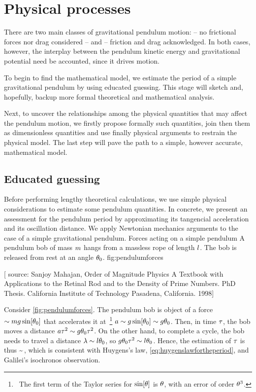 \section{Physical processes}
There are two main classes of gravitational pendulum motion:  -- no frictional forces nor drag considered -- and  -- friction and drag acknowledged. In both cases, however, the interplay between the pendulum kinetic energy and gravitational potential need be accounted, since it drives motion.

To begin to find the mathematical model, we estimate the period of a simple gravitational pendulum by using educated guessing. This stage will sketch and, hopefully, backup more formal theoretical and mathematical analysis.

Next, to uncover the relationships among the physical quantities that may affect the pendulum motion, we firstly propose formally such quantities, join then them as dimensionless quantities and use finally physical arguments to restrain the physical model. The last step will pave the path to a simple, however accurate, mathematical model.


\subsection{Educated guessing}
Before performing lengthy theoretical calculations, we use simple physical considerations to estimate some pendulum quantities. In concrete, we present an assessment for the pendulum period by approximating its tangencial acceleration and its oscillation distance. We apply Newtonian mechanics arguments to the case of a simple gravitational pendulum. 
%
   {Forces acting on a simple pendulum}
   {A pendulum bob of mass $m$ hangs from a massless rope of length $l$. The bob is released from rest at an angle $\theta_0$.}%
   {fig:pendulumforces}%

[ source: Sanjoy Mahajan, Order of Magnitude Physics A Textbook with Applications to the Retinal Rod and to the Density of Prime Numbers. PhD Thesis. California Institute of Technology Pasadena, California. 1998]

Consider \cref{fig:pendulumforces}. The pendulum bob is object of a force $\sim mg\sin\!\left[{\theta_0}\right]$ that accelerates it at~\footnote{~The first term of the Taylor series for $\sin\!\left[{\theta}\right]$ is $\theta$, with an error of order $\theta^3$.} $a\sim g\sin\!\left[{\theta_0}\right]\sim g\theta_0$. Then, in time $\tau$, the bob moves a distance $a\tau^2\sim g\theta_0\tau^2$. On the other hand, to complete a cycle, the bob needs to travel a distance $\lambda\sim l\theta_0$, so $g\theta_0\tau^2 \sim l\theta_0$. Hence, the estimation of $\tau$ is thus
\beq
\oscper\sim\sqrt{\dfrac{\length}{\grav}}\,,
\eeq
which is consistent with Huygens's law, \cref{eq:huygenslawfortheperiod}, and Galilei's isochronos observation.

